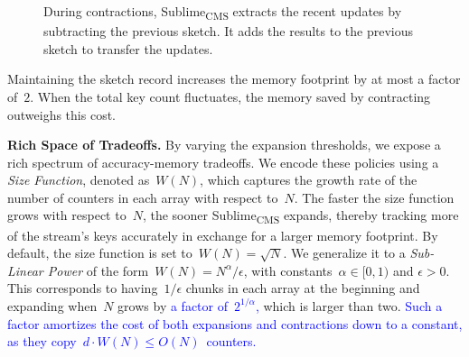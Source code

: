 \documentclass[sigconf]{acmart}
\newcommand{\sketch}{Sublime}
\newcommand{\sketchcms}{\sketch\textsubscript{CMS}\xspace}
\begin{document}
\begin{figure}
    \caption{During contractions, \sketchcms extracts the recent updates by
    subtracting the previous sketch. It adds the results to the previous sketch
    to transfer the updates.}
    \label{fig:contraction}
\end{figure}
\fi

Maintaining the sketch record increases the memory footprint by at most a
factor of~$2$. When the total key count fluctuates, the memory saved by
contracting outweighs this cost.

\textbf{Rich Space of Tradeoffs.}
By varying the expansion thresholds, we expose a rich spectrum of
accuracy-memory tradeoffs. We encode these policies using a \emph{Size
Function}, denoted as~$W(N)$, which captures the growth rate of the number of
counters in each array with respect to~$N$. The faster the size function grows
with respect to~$N$, the sooner \sketchcms expands, thereby tracking more of
the stream's keys accurately in exchange for a larger memory footprint. By
default, the size function is set to~$W(N)=\sqrt{N}$. We generalize it to a
\emph{Sub-Linear Power} of the form~$W(N)=N^\alpha/\epsilon$, with
constants~$\alpha \in [0,1)$ and $\epsilon > 0$. This corresponds to
having~$1/\epsilon$ chunks in each array at the beginning and expanding
when~$N$ grows by \textcolor{blue}{a factor of~$2^{1/\alpha}$,} which is larger
than two. \textcolor{blue}{Such a factor amortizes the cost of both expansions
and contractions down to a constant, as they copy~\mbox{$d \cdot W(N) \leq
O(N)$}~counters.}
\end{document}
